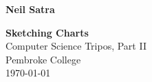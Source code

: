 

\begin{titlepage}

\hfill{\LARGE \bf Neil Satra}

\vspace*{\fill}

\begin{center}
\begin{doublespacing}


\Huge {\bf Sketching Charts} \\
Computer Science Tripos, Part II \\
Pembroke College \\
\today

\end{doublespacing}
\end{center}

\vspace*{\fill}
\end{titlepage}